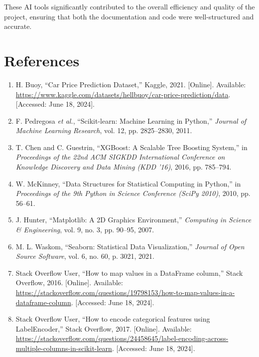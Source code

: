 \documentclass[journal]{IEEEtran}
\begin{document}
These AI tools significantly contributed to the overall efficiency and quality of the project, ensuring that both the documentation and code were well-structured and accurate.

\section{References}

\begin{enumerate}

    \item H. Buoy, “Car Price Prediction Dataset,” Kaggle, 2021. [Online]. Available: \url{https://www.kaggle.com/datasets/hellbuoy/car-price-prediction/data}. [Accessed: June 18, 2024].

    \item F. Pedregosa \textit{et al.}, “Scikit-learn: Machine Learning in Python,” \textit{Journal of Machine Learning Research}, vol. 12, pp. 2825–2830, 2011.

    \item T. Chen and C. Guestrin, “XGBoost: A Scalable Tree Boosting System,” in \textit{Proceedings of the 22nd ACM SIGKDD International Conference on Knowledge Discovery and Data Mining (KDD '16)}, 2016, pp. 785–794.

    \item W. McKinney, “Data Structures for Statistical Computing in Python,” in \textit{Proceedings of the 9th Python in Science Conference (SciPy 2010)}, 2010, pp. 56–61.

    \item J. Hunter, “Matplotlib: A 2D Graphics Environment,” \textit{Computing in Science \& Engineering}, vol. 9, no. 3, pp. 90–95, 2007.

    \item M. L. Waskom, “Seaborn: Statistical Data Visualization,” \textit{Journal of Open Source Software}, vol. 6, no. 60, p. 3021, 2021.

    \item Stack Overflow User, “How to map values in a DataFrame column,” Stack Overflow, 2016. [Online]. Available: \url{https://stackoverflow.com/questions/19798153/how-to-map-values-in-a-dataframe-column}. [Accessed: June 18, 2024].

    \item Stack Overflow User, “How to encode categorical features using LabelEncoder,” Stack Overflow, 2017. [Online]. Available: \url{https://stackoverflow.com/questions/24458645/label-encoding-across-multiple-columns-in-scikit-learn}. [Accessed: June 18, 2024].


\end{enumerate}
\end{document}
